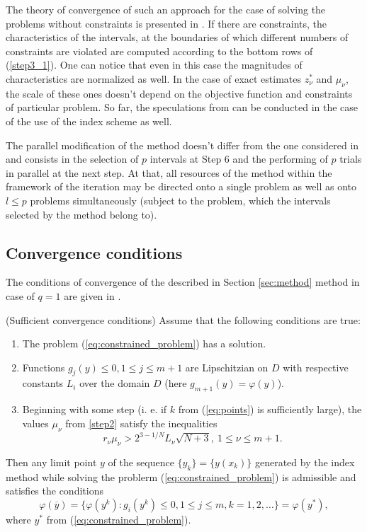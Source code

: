 \documentclass[runningheads]{llncs}
\begin{document}
The theory of convergence of such an approach for the case of solving the problems without
constraints is presented in \cite{BarkalovStrongin2018}.
If there are constraints, the characteristics of the intervals, at the boundaries of which different
numbers of constraints are violated are computed according to the bottom rows of
(\ref{step3_1}).
One can notice that even in this case the magnitudes of characteristics are normalized as well.
In the case of exact estimates \(z_{\nu }^{*}\) and \(\mu _{\nu }\), the scale of these ones
doesn't depend on the objective function and constraints of particular problem.
So far, the speculations from \cite{BarkalovStrongin2018} can be conducted in the case of the
use of the index scheme as well.

The parallel modification of the method doesn't differ from the one considered in
\cite{BarkalovStrongin2018} and consists in the selection of \(p\) intervals at Step 6 and the
performing of \(p\) trials in parallel at the next step.
At that, all resources of the method within the framework of the iteration may be directed onto
a single problem as well as onto \(l\leqslant p\) problems simultaneously (subject to the problem,
which the intervals selected by the method belong to).

\subsection{Convergence conditions }
\label{sec:conv_method}

The conditions of convergence of the described in Section \ref{sec:method} method in case of \(q=1\) are given in \cite{Strongin2000}.
\begin{theorem} (Sufficient convergence conditions)
  \label{th:single_conv}
  Assume that the following conditions are true:
  \begin{enumerate}
    \item The problem (\ref{eq:constrained_problem}) has a solution.
    \item Functions \(g_j(y)\leqslant 0, 1\leqslant j\leqslant m + 1\) are Lipschitzian on \(D\) with
respective constants \(L_i\) over the domain \(D\) (here \(g_{m+1}(y)=\varphi(y)\)).
    \item Beginning with some step (i. e. if \(k\) from (\ref{eq:points}) is sufficiently large),
    the values \(\mu_\nu\) from \ref{step2} satisfy the inequalities
    \begin{equation}
      r_\nu\mu_\nu > 2^{3-1/N}L_\nu \sqrt{N+3},\: 1\leqslant \nu \leqslant m + 1.
    \end{equation}
  \end{enumerate}
  Then any limit point \(y\) of the sequence \(\{y_k\} = \{y(x_k)\}\) generated
  by the index method while solving the problerm
  (\ref{eq:constrained_problem}) is admissible and satisfies the conditions
\begin{equation}
  \label{eq:conv_cond}
  \varphi(\overline{y})=\{ \varphi(y^k): g_i(y^k)\leqslant 0,1\leqslant j\leqslant m, k=1,2,\dots\}=\varphi(y^*),
\end{equation}
  where \(y^*\) from (\ref{eq:constrained_problem}).
\end{theorem}
\end{document}
